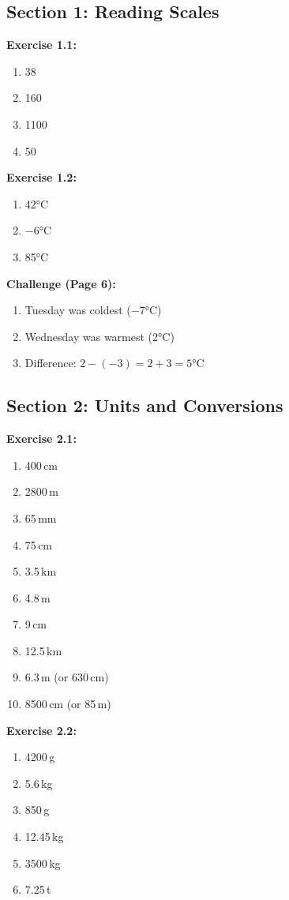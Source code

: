 \documentclass[12pt,a4paper]{article}
\begin{document}
\subsection{Section 1: Reading Scales}

\textbf{Exercise 1.1:}
\begin{enumerate}[label=\alph*)]
\item 38
\item 160
\item 1100
\item 50
\end{enumerate}

\textbf{Exercise 1.2:}
\begin{enumerate}[label=\alph*)]
\item 42°C
\item −6°C
\item 85°C
\end{enumerate}

\textbf{Challenge (Page 6):}
\begin{enumerate}[label=\alph*)]
\item Tuesday was coldest (−7°C)
\item Wednesday was warmest (2°C)
\item Difference: $2 - (-3) = 2 + 3 = 5$°C
\end{enumerate}

\subsection{Section 2: Units and Conversions}

\textbf{Exercise 2.1:}
\begin{enumerate}
\item 400\,cm
\item 2800\,m
\item 65\,mm
\item 75\,cm
\item 3.5\,km
\item 4.8\,m
\item 9\,cm
\item 12.5\,km
\item 6.3\,m (or 630\,cm)
\item 8500\,cm (or 85\,m)
\end{enumerate}

\textbf{Exercise 2.2:}
\begin{enumerate}
\item 4200\,g
\item 5.6\,kg
\item 850\,g
\item 12.45\,kg
\item 3500\,kg
\item 7.25\,t
\end{enumerate}
\end{document}
